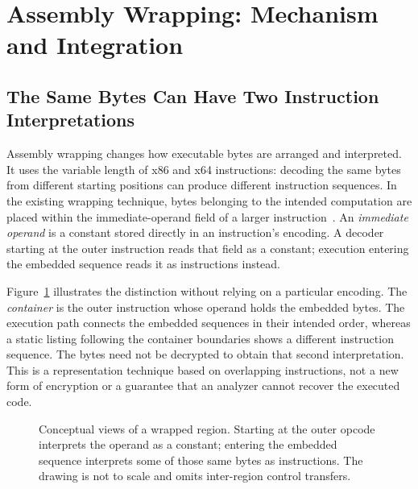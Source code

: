 \section{Assembly Wrapping: Mechanism and Integration}\label{sec:wrapping}
\subsection{The Same Bytes Can Have Two Instruction Interpretations}
Assembly wrapping changes how executable bytes are arranged and interpreted.
It uses the variable length of x86 and x64 instructions: decoding the same
bytes from different starting positions can produce different instruction
sequences. In the existing wrapping technique, bytes belonging to the
intended computation are placed within the immediate-operand field of a
larger instruction~\cite{assembly_wrapping}. An \emph{immediate operand} is
a constant stored directly in an instruction's encoding. A decoder starting
at the outer instruction reads that field as a constant; execution entering
the embedded sequence reads it as instructions instead.

Figure~\ref{fig:wrapping_views} illustrates the distinction without relying
on a particular encoding. The \emph{container} is the outer instruction
whose operand holds the embedded bytes. The execution path connects the
embedded sequences in their intended order, whereas a static listing
following the container boundaries shows a different instruction sequence.
The bytes need not be decrypted to obtain that second interpretation.
This is a representation technique based on overlapping instructions, not
a new form of encryption or a guarantee that an analyzer cannot recover
the executed code.

\begin{figure}[t]
\centering
{}
\caption{Conceptual views of a wrapped region. Starting at the outer
opcode interprets the operand as a constant; entering the embedded
sequence interprets some of those same bytes as instructions.
The drawing is not to scale and omits inter-region control transfers.}
\label{fig:wrapping_views}
\end{figure}


